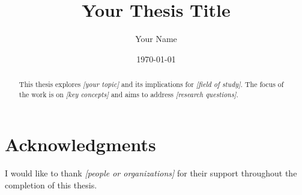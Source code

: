 \documentclass[12pt,a4paper]{report}
\title{Your Thesis Title}
\author{Your Name}
\date{\today}
\begin{document}
\maketitle


\begin{abstract}
    This thesis explores \textit{[your topic]} and its implications for \textit{[field of study]}. The focus of the work is on \textit{[key concepts]} and aims to address \textit{[research questions]}.
\end{abstract}


\chapter*{Acknowledgments}
I would like to thank \textit{[people or organizations]} for their support throughout the completion of this thesis.
\end{document}
